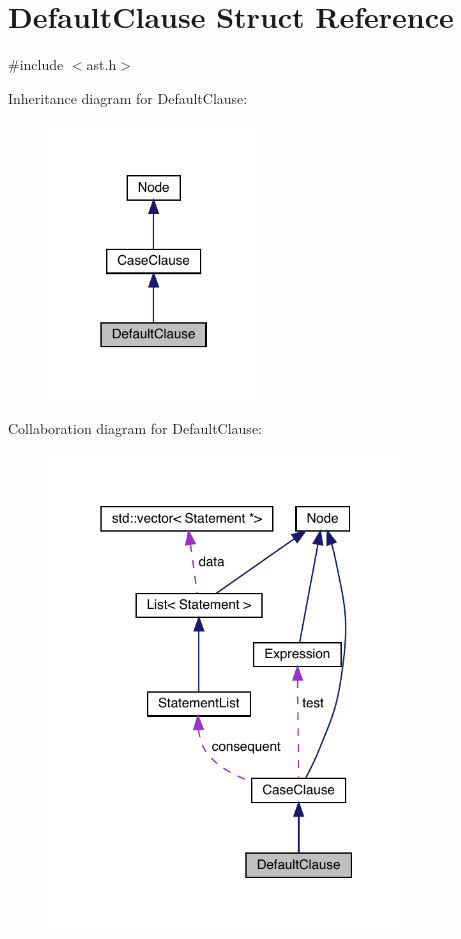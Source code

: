 \hypertarget{struct_default_clause}{}\section{Default\+Clause Struct Reference}
\label{struct_default_clause}


{\ttfamily \#include $<$ast.\+h$>$}



Inheritance diagram for Default\+Clause\+:\nopagebreak
\begin{figure}[H]
\begin{center}
\leavevmode
\includegraphics[width=159pt]{struct_default_clause__inherit__graph}
\end{center}
\end{figure}


Collaboration diagram for Default\+Clause\+:\nopagebreak
\begin{figure}[H]
\begin{center}
\leavevmode
\includegraphics[width=268pt]{struct_default_clause__coll__graph}
\end{center}
\end{figure}
